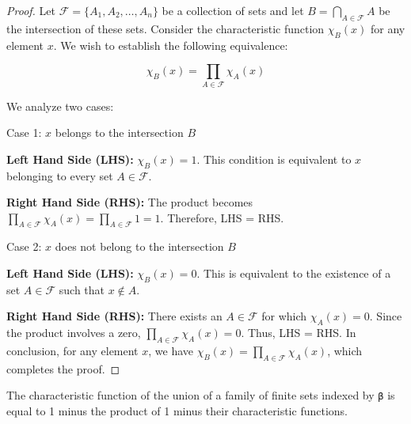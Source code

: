 \begin{proof}
  \leanok
  Let $\mathcal{F} = \{A_1, A_2, \ldots, A_n\}$ be a collection of sets and let $B = \bigcap_{A \in \mathcal{F}} A$ be the intersection of these sets. Consider the characteristic function $\chi_B(x)$ for any element $x$. We wish to establish the following equivalence:

  \begin{equation*}
  \chi_B(x) = \prod_{A \in \mathcal{F}} \chi_A(x)
  \end{equation*}

  We analyze two cases:

  Case 1: $x$ belongs to the intersection $B$

  \textbf{Left Hand Side (LHS):} $\chi_B(x) = 1$. This condition is equivalent to $x$ belonging to every set $A \in \mathcal{F}$.

  \textbf{Right Hand Side (RHS):} The product becomes $\prod_{A \in \mathcal{F}} \chi_A(x) = \prod_{A \in \mathcal{F}} 1 = 1$. Therefore, LHS = RHS.

  Case 2: $x$ does not belong to the intersection $B$

  \textbf{Left Hand Side (LHS):} $\chi_B(x) = 0$. This is equivalent to the existence of a set $A \in \mathcal{F}$ such that $x \not\in A$.

  \textbf{Right Hand Side (RHS):} There exists an $A \in \mathcal{F}$ for which $\chi_A(x) = 0$. Since the product involves a zero, $\prod_{A \in \mathcal{F}} \chi_A(x) = 0$. Thus, LHS = RHS.
  In conclusion, for any element $x$, we have $\chi_B(x) = \prod_{A \in \mathcal{F}} \chi_A(x)$, which completes the proof.

\end{proof}

\begin{lemma}\label{char_fun_FinUnion}
  The characteristic function of the union of a family of finite sets indexed by \verb|β| is equal to 1 minus the product of 1 minus their characteristic functions.
\end{lemma}

